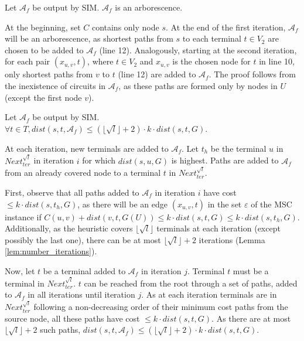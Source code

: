 \begin{Lem}
  \label{lem:sim_output_arborescence}
  Let $\mathcal{A}_f$ be output by SIM. $\mathcal{A}_f$ is an arborescence.
\end{Lem}
  \begin{Proof}
    At the beginning, set $C$ contains only node $s$. At the end of the first iteration, $\mathcal{A}_f$ will be an arborescence, 
as shortest paths 
from $s$ to each terminal $t \in V_2$ are chosen to be added to $\mathcal{A}_f$ (line 12). Analogously, starting at the second iteration, for each pair $(x_{u,v},t)$, where 
$t \in V_2$ and $x_{u,v}$ is the chosen node for $t$ in line 10, only shortest paths from $v$ to $t$ (line 12) are added to $\mathcal{A}_f$. The proof follows from the inexistence of circuits in $\mathcal{A}_f$, as these paths are 
formed only by nodes in $U$ (except the first node $v$).
  \end{Proof}

\begin{Theo}
  \label{teo:cost}
  Let $\mathcal{A}_f$ be output by SIM. $\forall t \in T, dist(s,t,\mathcal{A}_f) \leq (\lfloor\sqrt{l}\rfloor+2) \cdot k \cdot dist(s,t,G)$.
\end{Theo}
  \begin{Proof}
At each iteration, new terminals are added to $\mathcal{A}_f$. Let $t_h$ be the terminal $u$ in $Next^{\sqrt{l}}_{ter}$ in iteration $i$ for which
$dist(s,u,G)$ is highest.
Paths are added to $\mathcal{A}_f$ from an already covered node to a terminal $t$ in $Next^{\sqrt{l}}_{ter}$.

First, observe that all paths added to $\mathcal{A}_f$ in iteration $i$ have cost $\le k \cdot dist(s,t_h,G)$, as there will be an edge $(x_{u,v}, t)$ in the set $\varepsilon$ of the MSC instance
if $C(u,v)+dist(v,t,G(U)) \le k \cdot dist(s,t,G) \le k \cdot dist(s,t_h,G)$. Additionally, as the heuristic covers $\lfloor \sqrt{l} \rfloor$ terminals at each iteration (except possibly the last one), 
there can be at most $\lfloor\sqrt{l}\rfloor+2$ iterations (Lemma \ref{lem:number_iterations}).

Now, let $t$ be a terminal added to $\mathcal{A}_f$ in iteration $j$. Terminal $t$ must be a terminal in $Next^{\sqrt{l}}_{ter}$. $t$ can be reached from
the root through a set of paths, added to $\mathcal{A}_f$ in all iterations until iteration $j$. As at each iteration terminals are in $Next^{\sqrt{l}}_{ter}$ following a non-decreasing
order of their minimum cost paths from the source node, all these paths have cost $\le k \cdot dist(s,t,G)$. As there are at most $\lfloor\sqrt{l}\rfloor+2$ such paths, $dist(s,t,\mathcal{A}_f) \le (\lfloor\sqrt{l}\rfloor+2) \cdot k \cdot dist(s,t,G)$. 
  \end{Proof}

